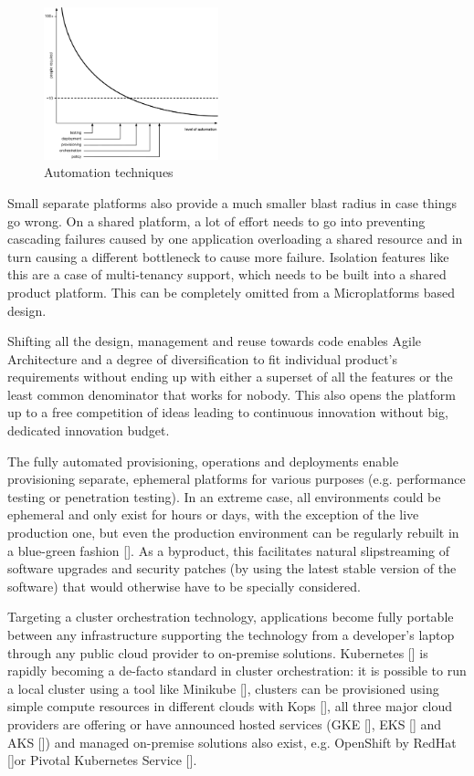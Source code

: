\documentclass[reprint,amsmath,amssymb,aps]{revtex4-1}
\begin{document}
\begin{figure}[h]
	\includegraphics[width=0.45\textwidth]{figs/automation-tools}
	\caption{Automation techniques}
	\label{fig:automation-techniques}
\end{figure}

Small separate platforms also provide a much smaller blast radius in case things go wrong. On a shared platform, a lot of effort needs to go into preventing cascading failures caused by one application overloading a shared resource and in turn causing a different bottleneck to cause more failure. Isolation features like this are a case of multi-tenancy support, which needs to be built into a shared product platform. This can be completely omitted from a Microplatforms based design.

Shifting all the design, management and reuse towards code enables Agile Architecture and a degree of diversification to fit individual product’s requirements without ending up with either a superset of all the features or the least common denominator that works for nobody. This also opens the platform up to a free competition of ideas leading to continuous innovation without big, dedicated innovation budget.

The fully automated provisioning, operations and deployments enable provisioning separate, ephemeral platforms for various purposes (e.g. performance testing or penetration testing). In an extreme case, all environments could be ephemeral and only exist for hours or days, with the exception of the live production one, but even the production environment can be regularly rebuilt in a blue-green fashion []. As a byproduct, this facilitates natural slipstreaming of software upgrades and security patches (by using the latest stable version of the software) that would otherwise have to be specially considered.

Targeting a cluster orchestration technology, applications become fully portable between any infrastructure supporting the technology from a developer’s laptop through any public cloud provider to on-premise solutions. Kubernetes [] is rapidly becoming a de-facto standard in cluster orchestration: it is possible to run a local cluster using a tool like Minikube [], clusters can be provisioned using simple compute resources in different clouds with Kops [], all three major cloud providers are offering or have announced hosted services (GKE [], EKS [] and AKS []) and managed on-premise solutions also exist, e.g. OpenShift by RedHat []or Pivotal Kubernetes Service [].
\end{document}
